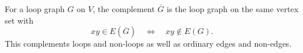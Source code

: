 \begin{definition}
For a loop graph \(G\) on \(V\), the complement \(\overline G\) is the loop graph on the same vertex set with
\[
  xy \in E(\overline G) \quad\Longleftrightarrow\quad xy \notin E(G).
\]
This complements loops and non-loops as well as ordinary edges and non-edges.
\end{definition}
